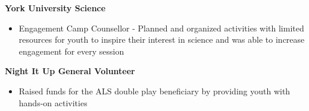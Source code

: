 \documentclass[11pt, a4paper]{awesome-cv}
\providecommand{\tightlist}{%
	\setlength{\itemsep}{0pt}\setlength{\parskip}{0pt}}
\begin{document}
\textbf{York University Science}

\begin{itemize}
\tightlist
\item
  Engagement Camp Counsellor - Planned and organized activities with limited resources for youth to inspire their interest in science and was able to increase engagement for every session
\end{itemize}

\textbf{Night It Up General Volunteer}

\begin{itemize}
\tightlist
\item
  Raised funds for the ALS double play beneficiary by providing youth with hands-on activities
\end{itemize}
\end{document}
